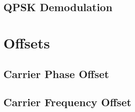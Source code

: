 \documentclass[]{article}
\begin{document}
\subsection{QPSK Demodulation}
\label{app:qpsk_demod}


\section{Offsets}
\label{app:offsets}
\subsection{Carrier Phase Offset}
\label{app:phase_offset}


\subsection{Carrier Frequency Offset}
\label{app:freq_offset}

\end{document}
